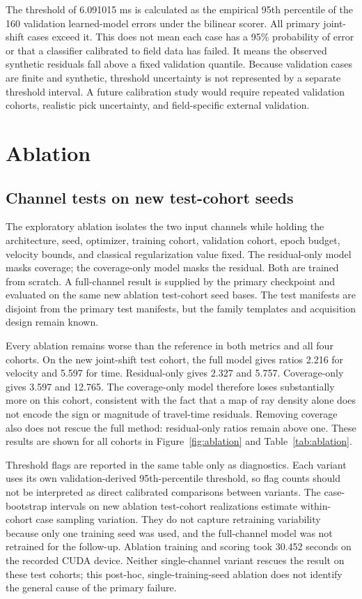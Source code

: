 \documentclass[11pt]{article}
\begin{document}
The threshold of 6.091015 ms is calculated as the empirical 95th percentile of the 160 validation learned-model errors under the bilinear scorer. All primary joint-shift cases exceed it. This does not mean each case has a 95\% probability of error or that a classifier calibrated to field data has failed. It means the observed synthetic residuals fall above a fixed validation quantile. Because validation cases are finite and synthetic, threshold uncertainty is not represented by a separate threshold interval. A future calibration study would require repeated validation cohorts, realistic pick uncertainty, and field-specific external validation.

\section{Ablation}
\label{sec:ablation}
\subsection{Channel tests on new test-cohort seeds}
\label{sec:ablation-results}
The exploratory ablation isolates the two input channels while holding the architecture, seed, optimizer, training cohort, validation cohort, epoch budget, velocity bounds, and classical regularization value fixed. The residual-only model masks coverage; the coverage-only model masks the residual. Both are trained from scratch. A full-channel result is supplied by the primary checkpoint and evaluated on the same new ablation test-cohort seed bases. The test manifests are disjoint from the primary test manifests, but the family templates and acquisition design remain known.

Every ablation remains worse than the reference in both metrics and all four cohorts. On the new joint-shift test cohort, the full model gives ratios 2.216 for velocity and 5.597 for time. Residual-only gives 2.327 and 5.757. Coverage-only gives 3.597 and 12.765. The coverage-only model therefore loses substantially more on this cohort, consistent with the fact that a map of ray density alone does not encode the sign or magnitude of travel-time residuals. Removing coverage also does not rescue the full method: residual-only ratios remain above one. These results are shown for all cohorts in Figure~\ref{fig:ablation} and Table~\ref{tab:ablation}.

Threshold flags are reported in the same table only as diagnostics. Each variant uses its own validation-derived 95th-percentile threshold, so flag counts should not be interpreted as direct calibrated comparisons between variants. The case-bootstrap intervals on new ablation test-cohort realizations estimate within-cohort case sampling variation. They do not capture retraining variability because only one training seed was used, and the full-channel model was not retrained for the follow-up. Ablation training and scoring took 30.452 seconds on the recorded CUDA device. Neither single-channel variant rescues the result on these test cohorts; this post-hoc, single-training-seed ablation does not identify the general cause of the primary failure.
\end{document}
